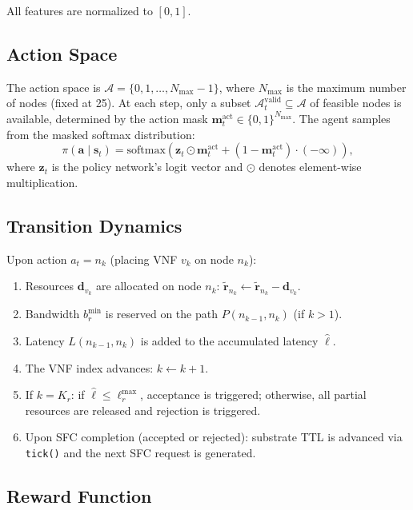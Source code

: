 All features are normalized to $[0, 1]$.

\subsection{Action Space}

The action space is $\mathcal{A} = \{0, 1, \ldots, N_{\max}-1\}$, where $N_{\max}$ is the maximum number of nodes (fixed at 25). At each step, only a subset $\mathcal{A}_t^{\text{valid}} \subseteq \mathcal{A}$ of feasible nodes is available, determined by the action mask $\mathbf{m}_t^{\text{act}} \in \{0,1\}^{N_{\max}}$. The agent samples from the masked softmax distribution:
\begin{equation}
\pi(\mathbf{a} \mid \mathbf{s}_t) = \text{softmax}\!\left(\mathbf{z}_t \odot \mathbf{m}_t^{\text{act}} + (1-\mathbf{m}_t^{\text{act}}) \cdot (-\infty)\right),
\end{equation}
where $\mathbf{z}_t$ is the policy network's logit vector and $\odot$ denotes element-wise multiplication.

\subsection{Transition Dynamics}

Upon action $a_t = n_k$ (placing VNF $v_k$ on node $n_k$):
\begin{enumerate}
  \item Resources $\mathbf{d}_{v_k}$ are allocated on node $n_k$: $\tilde{\mathbf{r}}_{n_k} \leftarrow \tilde{\mathbf{r}}_{n_k} - \mathbf{d}_{v_k}$.
  \item Bandwidth $b_r^{\min}$ is reserved on the path $P(n_{k-1}, n_k)$ (if $k > 1$).
  \item Latency $L(n_{k-1}, n_k)$ is added to the accumulated latency $\hat{\ell}$.
  \item The VNF index advances: $k \leftarrow k+1$.
  \item If $k = K_r$: if $\hat{\ell} \leq \ell_r^{\max}$, acceptance is triggered; otherwise, all partial resources are released and rejection is triggered.
  \item Upon SFC completion (accepted or rejected): substrate TTL is advanced via \texttt{tick()} and the next SFC request is generated.
\end{enumerate}

\subsection{Reward Function}

